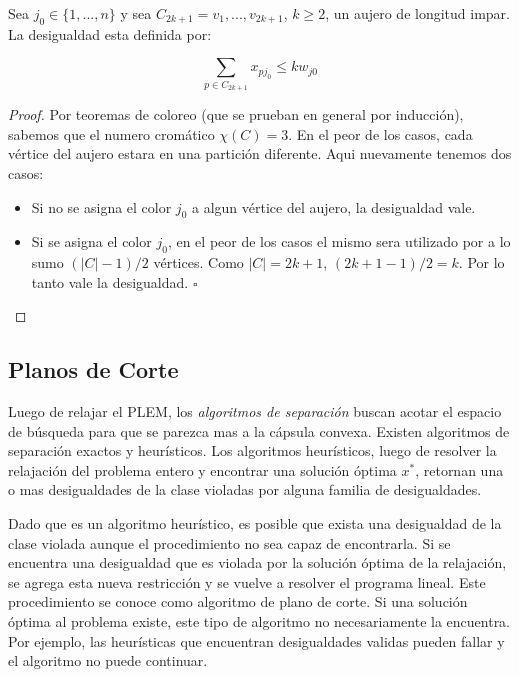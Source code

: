 Sea $j_0 \in \{1,...,n\}$ y sea $C_{2k+1} = v_1,...,v_{2k+1}$, $k \geq 2$, un aujero de longitud impar. La desigualdad esta definida por:

\begin{equation}
\sum_{p \in C_{2k+1}} x_{pj_0} \leq k w_{j0}
\end{equation}

\begin{proof}
Por teoremas de coloreo (que se prueban en general por inducción), sabemos que el numero cromático $\chi(C) = 3$. En el peor de los casos, cada vértice del aujero estara en una partición diferente. Aqui nuevamente tenemos dos casos:

\begin{itemize}
\item Si no se asigna el color $j_0$ a algun vértice del aujero, la desigualdad vale.
\item Si se asigna el color $j_0$, en el peor de los casos el mismo sera utilizado por a lo sumo $(|C|-1)/2$ vértices. Como $|C| = 2k+1$,  $(2k+1-1)/2 = k$. Por lo tanto vale la desigualdad.  \hfill $\square$
\end{itemize}

\end{proof}

\subsection{Planos de Corte}

Luego de relajar el PLEM, los \textit{algoritmos de separación} buscan acotar el espacio de búsqueda para que se parezca mas a la cápsula convexa. Existen algoritmos de separación exactos y heurísticos. Los algoritmos heurísticos, luego de resolver la relajación del problema entero y encontrar una solución óptima $x^*$, retornan una o mas desigualdades de la clase violadas por alguna familia de desigualdades.

Dado que es un algoritmo heurístico, es posible que exista una desigualdad de la clase violada aunque el procedimiento no sea capaz de encontrarla. Si se encuentra una desigualdad que es violada por la solución óptima de la relajación, se agrega esta nueva restricción y se vuelve a resolver el programa lineal. Este procedimiento se conoce como algoritmo de plano de corte. Si una solución óptima al problema existe, este tipo de algoritmo no necesariamente la encuentra. Por ejemplo, las heurísticas que encuentran desigualdades validas pueden fallar y el algoritmo no puede continuar.

